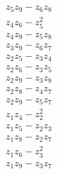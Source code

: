 \documentclass[11pt,a4paper]{article}
\begin{document}
\begin{gather*}
z_{5} z_{9} - z_{6} z_{8} \\
z_{4} z_{6} - z_{5}^{2} \\
z_{4} z_{9} - z_{5} z_{8} \\
z_{3} z_{9} - z_{6} z_{7} \\
z_{2} z_{5} - z_{3} z_{4} \\
z_{2} z_{6} - z_{3} z_{5} \\
z_{2} z_{9} - z_{3} z_{8} \\
z_{2} z_{8} - z_{4} z_{7} \\
z_{2} z_{9} - z_{5} z_{7} \\
z_{1} z_{4} - z_{2}^{2} \\
z_{1} z_{5} - z_{2} z_{3} \\
z_{1} z_{8} - z_{2} z_{7} \\
z_{1} z_{6} - z_{3}^{2} \\
z_{1} z_{9} - z_{3} z_{7}
\end{gather*}
\end{document}
